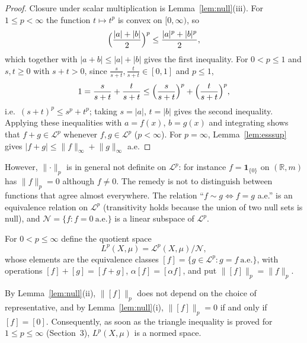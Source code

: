 \documentclass[11pt]{article}
\newcommand{\R}{\mathbb{R}}
\newcommand{\norm}[1]{\lVert #1\rVert}
\newcommand{\ind}{\mathbf{1}}
\begin{document}
\begin{proof}
Closure under scalar multiplication is Lemma~\ref{lem:null}(iii). For $1\le p<\infty$ the function $t\mapsto t^{p}$ is convex on $[0,\infty)$, so
\[
\Bigl(\frac{|a|+|b|}{2}\Bigr)^{p}\le\frac{|a|^{p}+|b|^{p}}{2},
\]
which together with $|a+b|\le|a|+|b|$ gives the first inequality. For $0<p\le1$ and $s,t\ge0$ with $s+t>0$, since $\frac{s}{s+t},\frac{t}{s+t}\in[0,1]$ and $p\le1$,
\[
1=\frac{s}{s+t}+\frac{t}{s+t}\le\Bigl(\frac{s}{s+t}\Bigr)^{p}+\Bigl(\frac{t}{s+t}\Bigr)^{p},
\]
i.e.\ $(s+t)^{p}\le s^{p}+t^{p}$; taking $s=|a|$, $t=|b|$ gives the second inequality. Applying these inequalities with $a=f(x)$, $b=g(x)$ and integrating shows that $f+g\in\mathcal{L}^{p}$ whenever $f,g\in\mathcal{L}^{p}$ ($p<\infty$). For $p=\infty$, Lemma~\ref{lem:esssup} gives $|f+g|\le\norm{f}_{\infty}+\norm{g}_{\infty}$ a.e.
\end{proof}

However, $\norm{\cdot}_{p}$ is in general not definite on $\mathcal{L}^{p}$: for instance $f=\ind_{\{0\}}$ on $(\R,m)$ has $\norm{f}_{p}=0$ although $f\ne0$. The remedy is not to distinguish between functions that agree almost everywhere. The relation ``$f\sim g\iff f=g$ a.e.'' is an equivalence relation on $\mathcal{L}^{p}$ (transitivity holds because the union of two null sets is null), and $\mathcal{N}=\{f:f=0\ \text{a.e.}\}$ is a linear subspace of $\mathcal{L}^{p}$.

\begin{definition}[$L^{p}$ spaces]\label{def:Lp}
For $0<p\le\infty$ define the quotient space
\[
L^{p}(X,\mu)=\mathcal{L}^{p}(X,\mu)/\mathcal{N},
\]
whose elements are the equivalence classes $[f]=\{g\in\mathcal{L}^{p}:g=f\ \text{a.e.}\}$, with operations $[f]+[g]=[f+g]$, $\alpha[f]=[\alpha f]$, and put $\norm{[f]}_{p}=\norm{f}_{p}$.
\end{definition}

By Lemma~\ref{lem:null}(ii), $\norm{[f]}_{p}$ does not depend on the choice of representative, and by Lemma~\ref{lem:null}(i), $\norm{[f]}_{p}=0$ if and only if $[f]=[0]$. Consequently, as soon as the triangle inequality is proved for $1\le p\le\infty$ (Section~3), $L^{p}(X,\mu)$ is a normed space.
\end{document}
